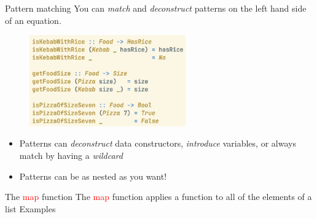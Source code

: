 \documentclass[pdf]{beamer}
\newcommand{\code}[1]{\textcolor{Red}{\textsf{#1}}}
\begin{document}
\begin{frame}{Pattern matching}
  You can \emph{match} and \emph{deconstruct} patterns on the left hand side of an equation.

    \begin{figure}[H]
    \centering
    \includegraphics[width=0.60\textwidth]{food-pattern-match}
  \end{figure}

  \begin{itemize}
  \item Patterns can \emph{deconstruct} data constructors, \emph{introduce} variables, or always match by having a \emph{wildcard}
  \item Patterns can be as nested as you want!
  \end{itemize}
\end{frame}

\begin{frame}{The \code{map} function}
  The \code{map} function applies a function to all of the elements of a list
  Examples
\begin{figure}[H]
    \centering
    \vspace{0.1cm}
    \vspace{0.1cm}
  \end{figure}
\end{frame}
\end{document}
